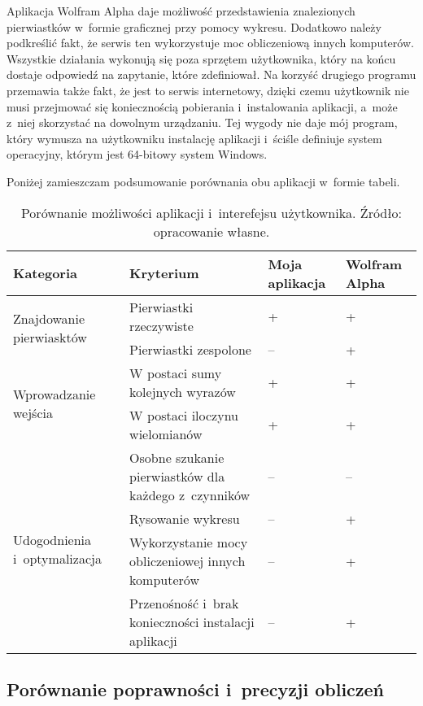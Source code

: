 Aplikacja Wolfram Alpha daje możliwość przedstawienia znalezionych pierwiastków w~formie graficznej przy pomocy wykresu. Dodatkowo należy podkreślić fakt, że serwis ten wykorzystuje moc obliczeniową innych komputerów. Wszystkie działania wykonują się poza sprzętem użytkownika, który na końcu dostaje odpowiedź na zapytanie, które zdefiniował. Na korzyść drugiego programu przemawia także fakt, że jest to serwis internetowy, dzięki czemu użytkownik nie musi przejmować się koniecznością pobierania i~instalowania aplikacji, a~może z~niej skorzystać na dowolnym urządzaniu. Tej wygody nie daje mój program, który wymusza na użytkowniku instalację aplikacji i~ściśle definiuje system operacyjny, którym jest 64-bitowy system Windows.

Poniżej zamieszczam podsumowanie porównania obu aplikacji w~formie tabeli.

\begin{table}[H]
	\begin{tabular}{ |p{4.7cm}|p{5.5cm}|p{1.5cm}|p{1.5cm}| } 
		\hline
		Kategoria & Kryterium & Moja aplikacja & Wolfram Alpha \\
		\hline
		\multirow{2}{*}{Znajdowanie pierwiasktów}
		& Pierwiastki rzeczywiste & + & + \\
		& Pierwiastki zespolone & -- & + \\
		\hline
		\multirow{2}{*}{Wprowadzanie wejścia}
		&W postaci sumy kolejnych wyrazów & + & + \\
		&W postaci iloczynu wielomianów & + & + \\
		\hline
		\multirow{4}{*}{Udogodnienia i~optymalizacja}
		&Osobne szukanie pierwiastków dla każdego z~czynników & -- & -- \\
		&Rysowanie wykresu & -- & + \\
		&Wykorzystanie mocy obliczeniowej innych komputerów & -- & + \\
		&Przenośność i~brak konieczności instalacji aplikacji & -- & + \\
		\hline
	\end{tabular}
	\caption{Porównanie możliwości aplikacji i~interefejsu użytkownika. Źródło: opracowanie własne.}
\end{table}

\subsection {Porównanie poprawności i~precyzji obliczeń}

